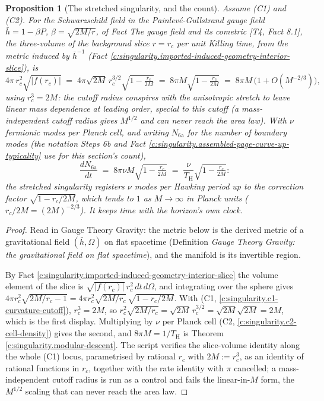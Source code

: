 \documentclass[11pt]{article}
\newtheorem{proposition}[theorem]{Proposition}
\theoremstyle{definition}
\theoremstyle{plain}
\newcommand{\changedmark}[2]{\marginpar{\raggedright\scriptsize\color{#1}#2}}
\providecommand{\TH}{}\renewcommand{\TH}{T_{\mathrm{H}}}
\providecommand{\hb}{}\renewcommand{\hb}{\bar{h}}
\begin{document}
\begin{proposition}[The stretched singularity, and the count]\label{c:singularity.stretched-singularity-count}
\changedmark{gray}{reworded}
Assume (C1) and (C2). For the Schwarzschild field in the Painlev\'e-Gullstrand gauge field $\hb = 1 - \beta P$, $\beta = \sqrt{2M/r}$, of Fact \emph{The gauge field and its cometric} [T4, Fact 8.1], the three-volume of the background slice $r = r_c$ per unit Killing time, from the metric induced by $\hb^{-1}$ (Fact \ref{c:singularity.imported-induced-geometry-interior-slice}), is
\[
4\pi\,r_c^{2}\sqrt{|f(r_c)|} \;=\; 4\pi\sqrt{2M}\,r_c^{3/2}\sqrt{1 - \tfrac{r_c}{2M}} \;=\; 8\pi M\sqrt{1 - \tfrac{r_c}{2M}} \;=\; 8\pi M\,\bigl(1 + O(M^{-2/3})\bigr) ,
\]
using $r_c^{3} = 2M$: the cutoff radius conspires with the anisotropic stretch to leave \emph{linear} mass dependence at leading order, special to this cutoff (a mass-independent cutoff radius gives $M^{1/2}$ and can never reach the area law). With $\nu$ fermionic modes per Planck cell, and writing $N_{\mathrm{6a}}$ for the number of boundary modes (the notation Steps 6b and Fact \ref{c:singularity.assembled-page-curve-up-typicality} use for this section's count),
\[
\frac{dN_{\mathrm{6a}}}{dt} \;=\; 8\pi\nu M\sqrt{1 - \tfrac{r_c}{2M}} \;=\; \frac{\nu}{\TH}\sqrt{1 - \tfrac{r_c}{2M}} :
\]
the stretched singularity registers $\nu$ modes per Hawking period up to the correction factor $\sqrt{1 - r_c/2M}$, which tends to $1$ as $M \to \infty$ in Planck units ($r_c/2M = (2M)^{-2/3}$). It keeps time with the horizon's own clock.
\end{proposition}
\begin{proof}
Read in Gauge Theory Gravity: the metric below is the derived metric of a gravitational field $(\hb, \Omega)$ on flat spacetime (Definition \emph{Gauge Theory Gravity: the gravitational field on flat spacetime}), and the manifold is its invertible region.

By Fact \ref{c:singularity.imported-induced-geometry-interior-slice} the volume element of the slice is $\sqrt{|f(r_c)|}\,r_c^{2}\,dt\,d\Omega$, and integrating over the sphere gives $4\pi r_c^{2}\sqrt{2M/r_c - 1} = 4\pi r_c^{2}\sqrt{2M/r_c}\,\sqrt{1 - r_c/2M}$. With (C1, \ref{c:singularity.c1-curvature-cutoff}), $r_c^{3} = 2M$, so $r_c^{2}\sqrt{2M/r_c} = \sqrt{2M}\,r_c^{3/2} = \sqrt{2M}\sqrt{2M} = 2M$, which is the first display. Multiplying by $\nu$ per Planck cell (C2, \ref{c:singularity.c2-cell-density}) gives the second, and $8\pi M = 1/\TH$ is Theorem \ref{c:singularity.modular-descent}. The script verifies the slice-volume identity along the whole (C1) locus, parametrised by rational $r_c$ with $2M := r_c^{3}$, as an identity of rational functions in $r_c$, together with the rate identity with $\pi$ cancelled; a mass-independent cutoff radius is run as a control and fails the linear-in-$M$ form, the $M^{1/2}$ scaling that can never reach the area law.

\end{proof}
\end{document}
